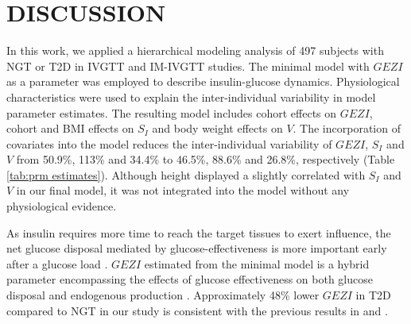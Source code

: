 \documentclass[utf8]{frontiersSCNS} %
\begin{document}
\section{DISCUSSION}
In this work, we applied a hierarchical modeling analysis of 497 subjects with NGT or T2D in IVGTT and IM-IVGTT studies. The minimal model with $GEZI$ as a parameter was employed to describe insulin-glucose dynamics. Physiological characteristics were used to explain the inter-individual variability in model parameter estimates. The resulting model includes cohort effects on $GEZI$, cohort and BMI effects on $S_I$ and body weight effects on $V$. The incorporation of covariates into the model reduces the inter-individual variability of $GEZI$, $S_I$ and $V$ from 50.9\%,  113\% and 34.4\% to 46.5\%, 88.6\% and 26.8\%, respectively (Table \ref{tab:prm estimates}). Although height displayed a slightly correlated with $S_I$ and $V$ in our final model, it was not integrated into the model without any physiological evidence.  

As insulin requires more time to reach the target tissues to exert influence, the net glucose disposal mediated by glucose-effectiveness is more important early after a glucose load \citep{Best1996}. $GEZI$ estimated from the minimal model is a hybrid parameter encompassing the effects of glucose effectiveness on both glucose disposal and endogenous production \citep{Vicini1999}. Approximately 48\% lower $GEZI$ in T2D compared to NGT in our study is consistent with the previous results in \citet{welch_1990} and \citet{ataru_1992}.   
\end{document}
